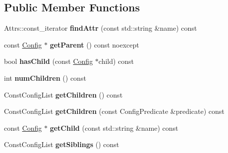 \subsection*{Public Member Functions}
\begin{DoxyCompactItemize}
\item 
\hypertarget{classtheoria_1_1config_1_1Config_a7576e899a6608ee9362e079959dac24c}{Attrs\+::const\+\_\+iterator {\bfseries find\+Attr} (const std\+::string \&name) const }\label{classtheoria_1_1config_1_1Config_a7576e899a6608ee9362e079959dac24c}

\item 
\hypertarget{classtheoria_1_1config_1_1Config_ac30090b5eedf4126046d7ace48b5fa40}{const \hyperlink{classtheoria_1_1config_1_1Config}{Config} $\ast$ {\bfseries get\+Parent} () const noexcept}\label{classtheoria_1_1config_1_1Config_ac30090b5eedf4126046d7ace48b5fa40}

\item 
\hypertarget{classtheoria_1_1config_1_1Config_a612dc92ad47937e7d1291d040252b860}{bool {\bfseries has\+Child} (const \hyperlink{classtheoria_1_1config_1_1Config}{Config} $\ast$child) const }\label{classtheoria_1_1config_1_1Config_a612dc92ad47937e7d1291d040252b860}

\item 
\hypertarget{classtheoria_1_1config_1_1Config_a5f37f0b2a36a64af46d3371ccbc0dd53}{int {\bfseries num\+Children} () const }\label{classtheoria_1_1config_1_1Config_a5f37f0b2a36a64af46d3371ccbc0dd53}

\item 
\hypertarget{classtheoria_1_1config_1_1Config_a2bfdab537ca5358f85d0e4ae8014b949}{Const\+Config\+List {\bfseries get\+Children} () const }\label{classtheoria_1_1config_1_1Config_a2bfdab537ca5358f85d0e4ae8014b949}

\item 
\hypertarget{classtheoria_1_1config_1_1Config_a8dffcbfc38e95e42d0357ebb112d7b62}{Const\+Config\+List {\bfseries get\+Children} (const Config\+Predicate \&predicate) const }\label{classtheoria_1_1config_1_1Config_a8dffcbfc38e95e42d0357ebb112d7b62}

\item 
\hypertarget{classtheoria_1_1config_1_1Config_a88395f87ae17b549a2e67297962a7a83}{const \hyperlink{classtheoria_1_1config_1_1Config}{Config} $\ast$ {\bfseries get\+Child} (const std\+::string \&name) const }\label{classtheoria_1_1config_1_1Config_a88395f87ae17b549a2e67297962a7a83}

\item 
\hypertarget{classtheoria_1_1config_1_1Config_afde7d3bd799b8f275bf8c30ffa9a28c9}{Const\+Config\+List {\bfseries get\+Siblings} () const }\label{classtheoria_1_1config_1_1Config_afde7d3bd799b8f275bf8c30ffa9a28c9}


\end{DoxyCompactItemize}
